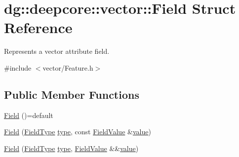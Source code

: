 \hypertarget{structdg_1_1deepcore_1_1vector_1_1_field}{}\section{dg\+:\+:deepcore\+:\+:vector\+:\+:Field Struct Reference}
\label{structdg_1_1deepcore_1_1vector_1_1_field}


Represents a vector attribute field.  




{\ttfamily \#include $<$vector/\+Feature.\+h$>$}

\subsection*{Public Member Functions}
\begin{DoxyCompactItemize}
\item 
\hyperlink{structdg_1_1deepcore_1_1vector_1_1_field_aa1488f634731a60718d69f4a7a6b90c2}{Field} ()=default
\item 
\hyperlink{structdg_1_1deepcore_1_1vector_1_1_field_ada62e105690439628f1b828d0a1a0f14}{Field} (\hyperlink{group___vector_module_gaedcee2e418daac47dd4516efa9a0b99d}{Field\+Type} \hyperlink{structdg_1_1deepcore_1_1vector_1_1_field_a890ae81662f3867f7617afa70c773535}{type}, const \hyperlink{group___vector_module_ga4b8ce414fd5c655308a07474c35828c0}{Field\+Value} \&\hyperlink{structdg_1_1deepcore_1_1vector_1_1_field_a236f34fb91447d2c807943a28ebcd119}{value})
\item 
\hyperlink{structdg_1_1deepcore_1_1vector_1_1_field_adf038346df08c470ca01331a5f36ef35}{Field} (\hyperlink{group___vector_module_gaedcee2e418daac47dd4516efa9a0b99d}{Field\+Type} \hyperlink{structdg_1_1deepcore_1_1vector_1_1_field_a890ae81662f3867f7617afa70c773535}{type}, \hyperlink{group___vector_module_ga4b8ce414fd5c655308a07474c35828c0}{Field\+Value} \&\&\hyperlink{structdg_1_1deepcore_1_1vector_1_1_field_a236f34fb91447d2c807943a28ebcd119}{value})
\end{DoxyCompactItemize}
